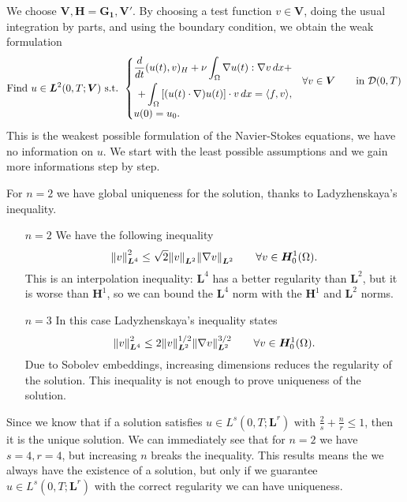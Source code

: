 \begin{remark}
    We choose \(\bm{V}, \bm{H} = \bm{G_1}, \bm{V'}\). By choosing a test function \(v \in \bm{V}\), doing the usual integration by parts, and using the boundary condition, we obtain the weak formulation
    \begin{equation*}
        \text{Find } u \in \bm{L}^2(0,T;\bm{V}) \text{ s.t. }
        \begin{cases}
            \begin{aligned}
                \frac{d}{dt}(u(t), v)_H + \nu \int_\Omega \nabla u(t) : \nabla v \, dx +\\
                + \int_\Omega \left[ (u(t) \cdot \nabla) u(t)\right] \cdot v \, dx = \langle f, v \rangle,
            \end{aligned} & \forall v \in \bm{V} \qquad \text{in } \mathcal{D}(0,T) \\
            u(0) = u_0.
        \end{cases}
    \end{equation*}
    This is the weakest possible formulation of the Navier-Stokes equations, we have no information on \(u\). We start with the least possible assumptions and we gain more informations step by step.
\end{remark}
For \(n=2\) we have global uniqueness for the solution, thanks to Ladyzhenskaya's inequality. 
\begin{itemize}
    \item[\(n=2\)] We have the following inequality
    \[
        \norm{v}^2_{\bm{L}^4} \leq \sqrt{2} \norm{v}_{\bm{L}^2} \norm{\nabla v}_{\bm{L}^2} \qquad \forall v \in \bm{H}^1_0(\Omega).
    \]
    This is an interpolation inequality: \(\bm{L}^4\) has a better regularity than \(\bm{L}^2\), but it is worse than \(\bm{H}^1\), so we can bound the \(\bm{L}^4\) norm with the \(\bm{H}^1\) and \(\bm{L}^2\) norms. 
    \item[\(n=3\)] In this case Ladyzhenskaya's inequality states
    \[
        \norm{v}^2_{\bm{L}^4} \leq 2 \norm{v}_{\bm{L}^2}^{1/2} \norm{\nabla v}_{\bm{L}^2}^{3/2} \qquad \forall v \in \bm{H}^1_0(\Omega).
    \]
    Due to Sobolev embeddings, increasing dimensions reduces the regularity of the solution. This inequality is not enough to prove uniqueness of the solution.
\end{itemize}
Since we know that if a solution satisfies \(u \in L^s(0,T;\bm{L}^r) \text{ with } \frac{2}{s}+\frac{n}{r} \leq 1\), then it is the unique solution. We can immediately see that for \(n=2\) we have \(s=4, r=4\), but increasing \(n\) breaks the inequality. This results means the we always have the existence of a solution, but only if we guarantee \(u \in L^s(0,T;\bm{L}^r)\) with the correct regularity we can have uniqueness.


